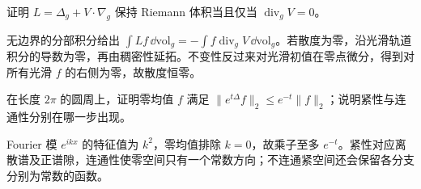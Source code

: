 \begin{exercise}[散度决定体积不变性]\label{ex:y14-invariant-volume}
证明 $L=\Delta_g+V\cdot\nabla_g$ 保持 Riemann 体积当且仅当 $\operatorname{div}_g V=0$。
\end{exercise}
\begin{solution}
无边界的分部积分给出 $\int Lf\,\dd\mathrm{vol}_g=-\int f\operatorname{div}_gV\,\dd\mathrm{vol}_g$。若散度为零，沿光滑轨道积分的导数为零，再由稠密性延拓。不变性反过来对光滑初值在零点微分，得到对所有光滑 $f$ 的右侧为零，故散度恒零。
\end{solution}

\begin{exercise}[圆周扩散的速率]\label{ex:y14-circle-heat}
在长度 $2\pi$ 的圆周上，证明零均值 $f$ 满足 $\|e^{t\Delta}f\|_2\le e^{-t}\|f\|_2$；说明紧性与连通性分别在哪一步出现。
\end{exercise}
\begin{solution}
Fourier 模 $e^{ikx}$ 的特征值为 $k^2$，零均值排除 $k=0$，故乘子至多 $e^{-t}$。紧性对应离散谱及正谱隙，连通性使零空间只有一个常数方向；不连通紧空间还会保留各分支分别为常数的函数。
\end{solution}
